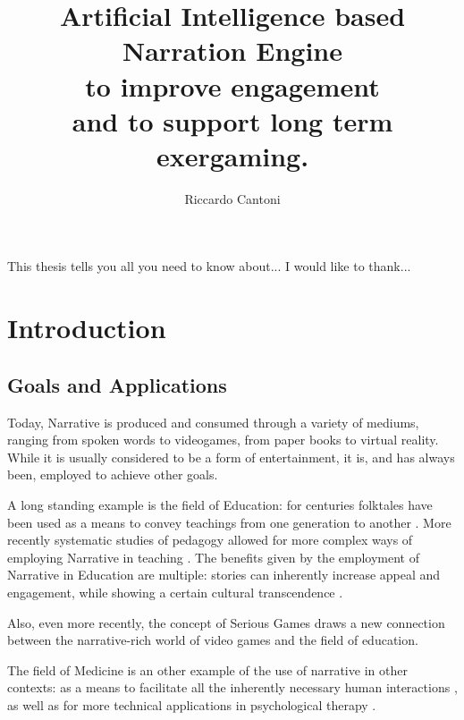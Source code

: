 \documentclass[12pt,a4paper,oneside]{report}
\begin{document}
\title{
Artificial Intelligence based \protect\\
Narration Engine \protect\\ 
to improve engagement \protect\\ 
\vspace{8pt}
and to support long term exergaming.}
\author{Riccardo Cantoni}
\beforepreface
{}
This thesis tells you all you need to know about...
I would like to thank...
\afterpreface

\pagebreak

\chapter{Introduction}
\section{Goals and Applications}

Today, Narrative is produced and consumed through a variety of mediums, ranging from spoken words to videogames, from paper books to virtual reality. While it is usually considered to be a form of entertainment, it is, and has always been, employed to achieve other goals.

A long standing example is the field of Education: for centuries folktales have been used as a means to convey teachings from one generation to another \cite{moraltales}. More recently systematic studies of pedagogy allowed for more complex ways of employing Narrative in teaching \cite{pedagogy}.
The benefits given by the employment of Narrative in Education are multiple: stories can inherently increase appeal and engagement, while showing a certain cultural transcendence \cite{narrationlearning}. 

Also, even more recently, the concept of Serious Games draws a new connection between the narrative-rich world of video games and the field of education.

The field of Medicine is an other example of the use of narrative in other contexts: as a means to facilitate all the inherently necessary human interactions \cite{narrativemedicine}, as well as for more technical applications in psychological therapy \cite{psychotherapy}.

\bigskip
\end{document}
